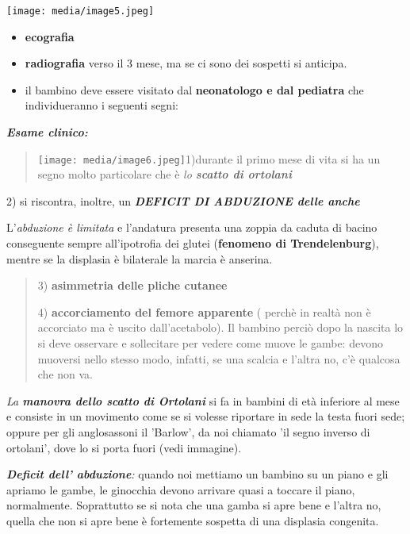 \documentclass[]{article}
\begin{document}
\texttt{[image: media/image5.jpeg]}

\begin{itemize}
\item
  \textbf{ecografia }
\item
  \textbf{radiografia} verso il 3 mese, ma se ci sono dei sospetti si
  anticipa.
\item
  il bambino deve essere visitato dal \textbf{neonatologo e dal
  pediatra} che individueranno i seguenti segni:
\end{itemize}

\textbf{\emph{Esame clinico:}}

\begin{quote}
\texttt{[image: media/image6.jpeg]}1)durante
il primo mese di vita si ha un segno molto particolare che è \emph{lo
\textbf{scatto di ortolani}}
\end{quote}

2) si riscontra, inoltre, un \textbf{\emph{DEFICIT DI ABDUZIONE delle
anche}}

L'\emph{abduzione è limitata} e l'andatura presenta una zoppia da caduta
di bacino conseguente sempre all'ipotrofia dei glutei (\textbf{fenomeno
di Trendelenburg}), mentre se la displasia è bilaterale la marcia è
anserina.

\begin{quote}
3) \textbf{asimmetria delle pliche cutanee}

4) \textbf{accorciamento del femore apparente} ( perchè in realtà non è
accorciato ma è uscito dall'acetabolo). Il bambino perciò dopo la
nascita lo si deve osservare e sollecitare per vedere come muove le
gambe: devono muoversi nello stesso modo, infatti, se una scalcia e
l'altra no, c'è qualcosa che non va.
\end{quote}

\emph{La \textbf{manovra dello scatto di Ortolani}} si fa in bambini di
età inferiore al mese e consiste in un movimento come se si volesse
riportare in sede la testa fuori sede; oppure per gli anglosassoni il
'Barlow', da noi chiamato 'il segno inverso di ortolani', dove lo si
porta fuori (vedi immagine).

\emph{\textbf{Deficit dell' abduzione}:} quando noi mettiamo un bambino
su un piano e gli apriamo le gambe, le ginocchia devono arrivare quasi a
toccare il piano, normalmente. Soprattutto se si nota che una gamba si
apre bene e l'altra no, quella che non si apre bene è fortemente
sospetta di una displasia congenita.
\end{document}
